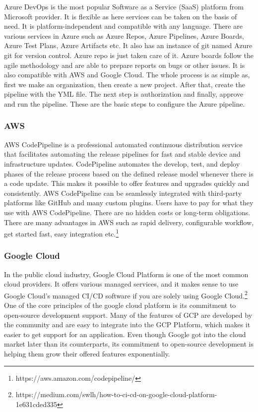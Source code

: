 Azure DevOps is the most popular Software as a Service (SaaS) platform from Microsoft provider. It is flexible as here services can be taken on the basis of need. It is platform-independent and compatible with any language. There are various services in Azure such as Azure Repos, Azure Pipelines, Azure Boards, Azure Test Plans, Azure Artifacts etc. It also has an instance of git named Azure git for version control. Azure repo is just taken care of it. Azure boards follow the agile methodology and are able to prepare reports on bugs or other issues. It is also compatible with AWS and Google Cloud. The whole process is as simple as, first we make an organization, then create a new project. After that, create the pipeline with the YML file. The next step is authorization and finally, approve and run the pipeline. These are the basic steps to configure the Azure pipeline.

%
\subsubsection{AWS}
%

AWS CodePipeline is a professional automated continuous distribution service that facilitates automating the release pipelines for fast and stable device and infrastructure updates. CodePipeline automates the develop, test, and deploy phases of the release process based on the defined release model whenever there is a code update. This makes it possible to offer features and upgrades quickly and consistently. AWS CodePipeline can be seamlessly integrated with third-party platforms like GitHub and many custom plugins. Users have to pay for what they use with AWS CodePipeline. There are no hidden costs or long-term obligations. There are many advantages in AWS such as rapid delivery, configurable workflow, get started fast, easy integration etc.\footnote{https://aws.amazon.com/codepipeline/}

%
\subsubsection{Google Cloud}
%
In the public cloud industry, Google Cloud Platform is one of the most common cloud providers. It offers various managed services, and it makes sense to use Google Cloud's managed CI/CD software if you are solely using Google Cloud.\footnote{https://medium.com/swlh/how-to-ci-cd-on-google-cloud-platform-1e631cded335} One of the core principles of the google cloud platform is its commitment to open-source development support. Many of the features of GCP are developed by the community and are easy to integrate into the GCP Platform, which makes it easier to get support for an application. Even though Google got into the cloud market later than its counterparts, its commitment to open-source development is helping them grow their offered features exponentially.  
%

